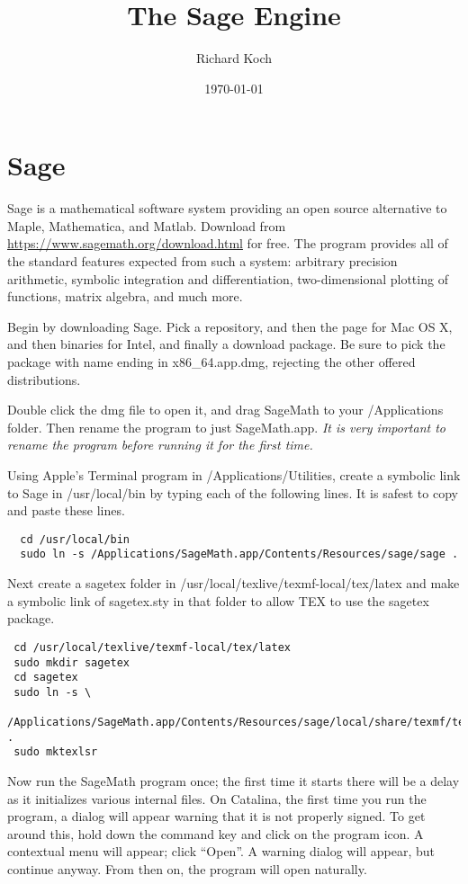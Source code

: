 \documentclass[11pt, oneside]{amsart}
\title{The Sage Engine}
\author{Richard Koch}
\date{\today}
\begin{document}
\maketitle
\vspace{-.3in}
\section{Sage}
Sage is a mathematical software system providing an open source alternative to Maple, Mathematica, and Matlab. Download from   
\url{https://www.sagemath.org/download.html} for free. The program provides all of the standard features expected from such a system: arbitrary precision arithmetic, symbolic integration and differentiation, two-dimensional plotting of functions, matrix algebra, and much more.

Begin by downloading Sage. Pick a repository, and then the page for Mac OS X, and then binaries for Intel, and finally a download package. Be sure to pick the package with name ending in x86\_64.app.dmg, rejecting the other offered distributions. 

Double click the dmg file to open it, and drag SageMath to your /Applications folder. Then rename the program to just SageMath.app. {\em It is very important to rename the program before running it for the first time.}

Using Apple's Terminal program in /Applications/Utilities, create a symbolic link to Sage in /usr/local/bin by typing each of the following lines. It is safest to  copy and paste these lines.
\begin{verbatim}
  cd /usr/local/bin
  sudo ln -s /Applications/SageMath.app/Contents/Resources/sage/sage .
\end{verbatim}

Next create a sagetex folder in /usr/local/texlive/texmf-local/tex/latex and make a symbolic link of sagetex.sty in that folder to allow TEX to use the sagetex package.
{\fontsize{8}{8}
\begin{verbatim}
 cd /usr/local/texlive/texmf-local/tex/latex 
 sudo mkdir sagetex
 cd sagetex
 sudo ln -s \
  /Applications/SageMath.app/Contents/Resources/sage/local/share/texmf/tex/latex/sagetex/sagetex.sty . 
 sudo mktexlsr
\end{verbatim}
}

Now run the SageMath program once; the first time it starts there will be a delay as it initializes various internal files. On Catalina, the first time you run the program, a dialog will appear warning that it is not properly signed. To get around this, hold down the command key and click on the program icon. A contextual menu will appear; click ``Open''. A warning dialog will appear, but continue anyway. From then on, the program will open naturally.
\end{document}
